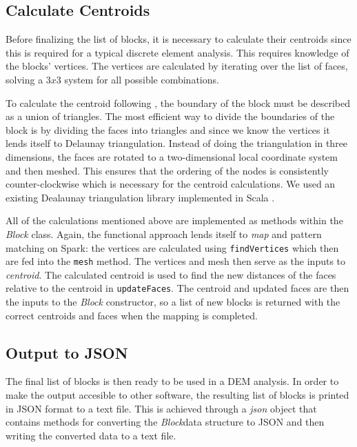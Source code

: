 \subsection{Calculate Centroids}
Before finalizing the list of blocks, it is necessary to calculate their centroids since this is required for a typical discrete element analysis. This requires knowledge of the blocks' vertices. The vertices are calculated by iterating over the list of faces, solving a $3x3$ system for all possible combinations. 

To calculate the centroid following \cite{centroid}, the boundary of the block must be described as a union of triangles. The most efficient way to divide the boundaries of the block is by dividing the faces into triangles and since we know the vertices it lends itself to Delaunay triangulation. Instead of doing the triangulation in three dimensions, the faces are rotated to a two-dimensional local coordinate system and then meshed. This ensures that the ordering of the nodes is consistently counter-clockwise which is necessary for the centroid calculations. We used an existing Dealaunay triangulation library implemented in Scala \cite{delaunay}.

All of the calculations mentioned above are implemented as methods within the \textit{Block} class. Again, the functional approach lends itself to \textit{map} and pattern matching on Spark: the vertices are calculated using \texttt{findVertices} which then are fed into the \texttt{mesh} method. The vertices and mesh then serve as the inputs to \textit{centroid}. The calculated centroid is used to find the new distances of the faces relative to the centroid in \texttt{updateFaces}. The centroid and updated faces are then the inputs to the \textit{Block} constructor, so a list of new blocks is returned with the correct centroids and faces when the mapping is completed.

\subsection{Output to JSON}
The final list of blocks is then ready to be used in a DEM analysis. In order to make the output accesible to other software, the resulting list of blocks is printed in JSON format to a text file. This is achieved through a \textit{json} object that contains methods for converting the \textit{Block}data structure to JSON and then writing the converted data to a text file. 

